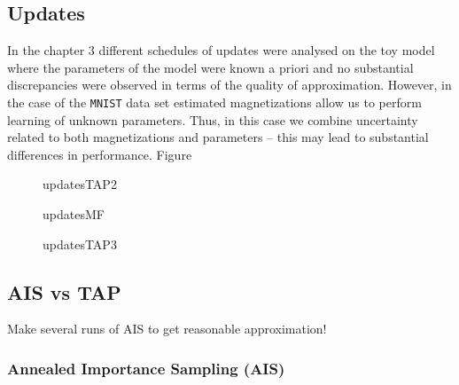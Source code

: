 \documentclass[../report/report.tex]{subfiles}
\begin{document}
\subsection{Updates }
In the chapter $3$ different schedules of updates were analysed on the toy model where the parameters of the model were known a priori and no substantial discrepancies were observed in terms of the quality of approximation. However, in the case of the \verb|MNIST| data set estimated magnetizations allow us to perform learning of unknown parameters. Thus, in this case we combine uncertainty related to both magnetizations and parameters -- this may lead to substantial differences in performance. Figure 

\begin{figure}[!htb]
\label{fig:updatesTAP2}
  \caption[1]{updatesTAP2}
\end{figure}

\begin{figure}[!htb]
\label{fig:updatesMF}
  \caption[1]{updatesMF}
\end{figure}

\begin{figure}[!htb]
\label{fig:updatesTAP3}
  \caption[1]{updatesTAP3}
\end{figure}

\subsection{AIS vs TAP}
Make several runs of AIS to get reasonable approximation!


\subsubsection{Annealed Importance Sampling (AIS)}
\end{document}
